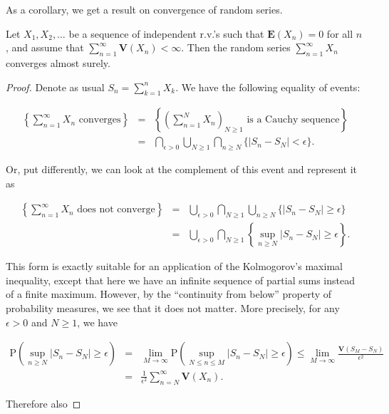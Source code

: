 \noindent As a corollary, we get a result on convergence of
random series.

\begin{thm}
\label{thm-one-series}
Let $X_1,X_2,\ldots$ be a sequence of independent
r.v.'s such that $\mathbf{E}(X_n)=0$ for all $n$, and
assume that
$\sum_{n=1}^\infty \mathbf{V}(X_n) < \infty$. Then
the random series $\sum_{n=1}^\infty X_n$ converges
almost surely.
\end{thm}

\begin{proof}
Denote as usual $S_n = \sum_{k=1}^n X_k$. We have the
following equality of events:

\begin{eqnarray*}
\left\{ \sum_{n=1}^\infty X_n\textrm{ converges}
\right\}
&=&
\left\{ \left(\sum_{n=1}^N X_n\right)_{N\ge 1} \textrm{ is a Cauchy sequence}
\right\} \\
&=&
\bigcap_{\epsilon>0}
\bigcup_{N\ge 1}
\bigcap_{n\ge N}
\Big\{
|S_n-S_N|<\epsilon
\Big\}.
\end{eqnarray*}

\noindent Or, put differently, we can look at the complement of
this event and represent it as

\begin{eqnarray*}
\left\{ \sum_{n=1}^\infty X_n\textrm{ does not converge}
\right\}
&=&
\bigcup_{\epsilon>0}
\bigcap_{N\ge 1}
\bigcup_{n\ge N}
\Big\{
|S_n-S_N|\ge\epsilon
\Big\} \\
&=&
\bigcup_{\epsilon>0}
\bigcap_{N\ge 1}
\left\{ \sup_{n\ge N}
|S_n-S_N|\ge\epsilon
\right\}.
\end{eqnarray*}

\noindent This form is exactly suitable for an application of
the Kolmogorov's maximal inequality, except that here
we have an infinite sequence of partial sums instead
of a finite maximum. However, by the ``continuity from
below'' property of probability measures, we see that
it does not matter. More precisely, for any
$\epsilon>0$ and $N\ge 1$, we have

\begin{eqnarray*}
\mathrm{P}\left(
\sup_{n\ge N}
|S_n-S_N|\ge\epsilon
\right) &=& \lim_{M\to\infty} \mathrm{P}\left(
\sup_{N\le n\le M}
|S_n-S_N|\ge\epsilon
\right) \le \lim_{M\to\infty} \frac{\mathbf{V}(S_M-S_N)}{\epsilon^2} \\ &=& \frac{1}{\epsilon^2} \sum_{n=N}^\infty \mathbf{V}(X_n).
\end{eqnarray*}

\noindent Therefore also


\end{proof}
